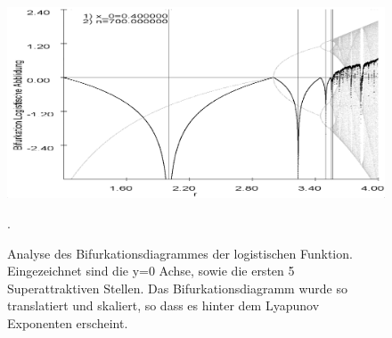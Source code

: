 \documentclass{scrartcl}
\begin{document}
\begin{figure}
\centering
\includegraphics[scale=0.45]{iteration/bifurk-log-lyapunov-periode}
\caption{Analyse des Bifurkationsdiagrammes der logistischen Funktion. Eingezeichnet sind die y=0 Achse, sowie die ersten 5 Superattraktiven Stellen. Das Bifurkationsdiagramm wurde so translatiert und skaliert, so dass es hinter dem Lyapunov Exponenten erscheint.}.
\label{fix:log-detail} 
\end{figure}
\end{document}
